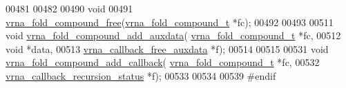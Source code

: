 \begin{DoxyCode}
00481 
00482 
00490 \textcolor{keywordtype}{void}
00491 \hyperlink{group__fold__compound_ga576a077b418a9c3650e06f8e5d296fc2}{vrna\_fold\_compound\_free}(\hyperlink{group__fold__compound_structvrna__fc__s}{vrna\_fold\_compound\_t} *fc);
00492 
00493 
00511 \textcolor{keywordtype}{void} \hyperlink{group__fold__compound_gafc44c76a1aacf61bfccb8cd698772b98}{vrna\_fold\_compound\_add\_auxdata}(
      \hyperlink{group__fold__compound_structvrna__fc__s}{vrna\_fold\_compound\_t}        *fc,
00512                                     \textcolor{keywordtype}{void}                        *data,
00513                                     \hyperlink{group__fold__compound_ga7806651f51b195013839a218b3bbd5a3}{vrna\_callback\_free\_auxdata}  *f);
00514 
00515 
00531 \textcolor{keywordtype}{void} \hyperlink{group__fold__compound_ga680ddfe1e67d1459689b1e92c80b9c4c}{vrna\_fold\_compound\_add\_callback}(
      \hyperlink{group__fold__compound_structvrna__fc__s}{vrna\_fold\_compound\_t}           *fc,
00532                                      \hyperlink{group__fold__compound_gac86036fa8cad1108832335063243cdc8}{vrna\_callback\_recursion\_status} *f);
00533 
00534 
00539 \textcolor{preprocessor}{#endif}
\end{DoxyCode}
